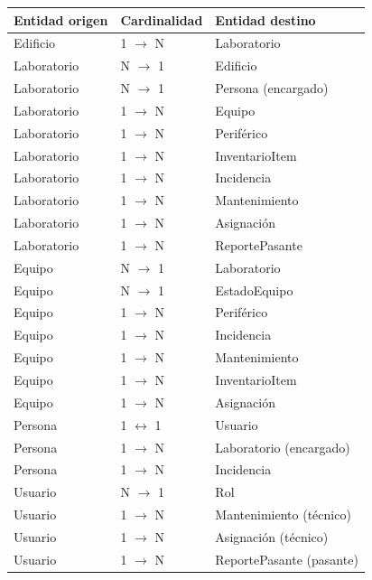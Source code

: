 \documentclass[12pt,a4paper]{article}
\begin{document}
\bigskip
\begin{longtable}{L{5cm} L{3cm} L{5cm}}
\toprule
\textbf{Entidad origen} & \textbf{Cardinalidad} & \textbf{Entidad destino} \\
\midrule
\endhead
\bottomrule
\endfoot
Edificio               & 1 $\rightarrow$ N & Laboratorio \\
Laboratorio            & N $\rightarrow$ 1 & Edificio \\
Laboratorio            & N $\rightarrow$ 1 & Persona (encargado) \\
Laboratorio            & 1 $\rightarrow$ N & Equipo \\
Laboratorio            & 1 $\rightarrow$ N & Periférico \\
Laboratorio            & 1 $\rightarrow$ N & InventarioItem \\
Laboratorio            & 1 $\rightarrow$ N & Incidencia \\
Laboratorio            & 1 $\rightarrow$ N & Mantenimiento \\
Laboratorio            & 1 $\rightarrow$ N & Asignación \\
Laboratorio            & 1 $\rightarrow$ N & ReportePasante \\
Equipo                 & N $\rightarrow$ 1 & Laboratorio \\
Equipo                 & N $\rightarrow$ 1 & EstadoEquipo \\
Equipo                 & 1 $\rightarrow$ N & Periférico \\
Equipo                 & 1 $\rightarrow$ N & Incidencia \\
Equipo                 & 1 $\rightarrow$ N & Mantenimiento \\
Equipo                 & 1 $\rightarrow$ N & InventarioItem \\
Equipo                 & 1 $\rightarrow$ N & Asignación \\
Persona                & 1 $\leftrightarrow$ 1 & Usuario \\
Persona                & 1 $\rightarrow$ N & Laboratorio (encargado) \\
Persona                & 1 $\rightarrow$ N & Incidencia \\
Usuario                & N $\rightarrow$ 1 & Rol \\
Usuario                & 1 $\rightarrow$ N & Mantenimiento (técnico) \\
Usuario                & 1 $\rightarrow$ N & Asignación (técnico) \\
Usuario                & 1 $\rightarrow$ N & ReportePasante (pasante) \\

\end{longtable}
\end{document}
